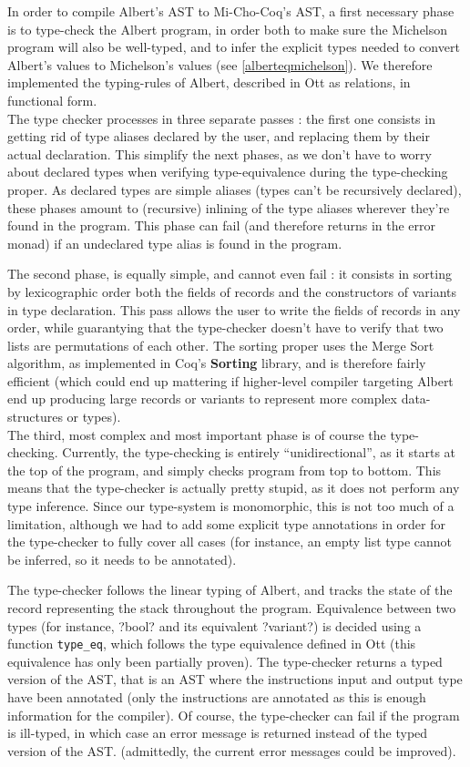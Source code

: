 \documentclass{report}
\begin{document}
In order to compile Albert's AST to Mi-Cho-Coq's AST, a first necessary phase is to type-check the Albert program, in order both to make sure the Michelson program will also be well-typed, and to infer the explicit types needed to convert Albert's values to Michelson's values (see \ref{alberteqmichelson}). We therefore implemented the typing-rules of Albert, described in Ott as relations, in functional form.\\

The type checker processes in three separate passes : the first one consists in getting rid of type aliases declared by the user, and replacing them by their actual declaration. This simplify the next phases, as we don't have to worry about declared types when verifying type-equivalence during the type-checking proper. As declared types are simple aliases (types can't be recursively declared), these phases amount to (recursive) inlining of the type aliases wherever they're found in the program. This phase can fail (and therefore returns in the error monad) if an undeclared type alias is found in the program.

The second phase, is equally simple, and cannot even fail : it consists in sorting by lexicographic order both the fields of records and the constructors of variants in type declaration. This pass allows the user to write the fields of records in any order, while guarantying that the type-checker doesn't have to verify that two lists are permutations of each other. The sorting proper uses the Merge Sort algorithm, as implemented in Coq's \textbf{Sorting} library, and is therefore fairly efficient (which could end up mattering if higher-level compiler targeting Albert end up producing large records or variants to represent more complex data-structures or types).\\

The third, most complex and most important phase is of course the type-checking. Currently, the type-checking is entirely ``unidirectional'', as it starts at the top of the program, and simply checks program from top to bottom. This means that the type-checker is actually pretty stupid, as it does not perform any type inference. Since our type-system is monomorphic, this is not too much of a limitation, although we had to add some explicit type annotations in order for the type-checker to fully cover all cases (for instance, an empty list type cannot be inferred, so it needs to be annotated).

The type-checker follows the linear typing of Albert, and tracks the state of the record representing the stack throughout the program. Equivalence between two types (for instance, ?bool? and its equivalent ?variant?) is decided using a function \texttt{type\_eq}, which follows the type equivalence defined in Ott (this equivalence has only been partially proven). The type-checker returns a typed version of the AST, that is an AST where the instructions input and output type have been annotated (only the instructions are annotated as this is enough information for the compiler). Of course, the type-checker can fail if the program is ill-typed, in which case an error message is returned instead of the typed version of the AST. (admittedly, the current error messages could be improved).
\end{document}
